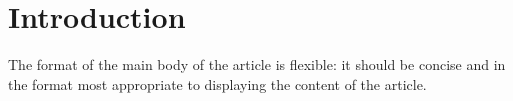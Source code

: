 \section*{Introduction} 
The format of the main body of the article is flexible: it should be concise and in the format most appropriate to displaying the content of the article.
